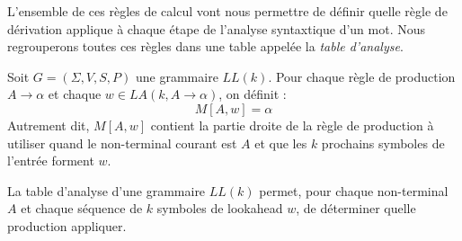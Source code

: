 L'ensemble de ces règles de calcul vont nous permettre de définir quelle règle de dérivation applique à chaque 
étape de l'analyse syntaxtique d'un mot. Nous regrouperons toutes ces règles dans une table appelée la 
\emph{table d'analyse}. 

\begin{definition}
     Soit $G = ( \Sigma, V, S, P)$ une grammaire $LL(k)$. Pour chaque règle de 
     production $A \longrightarrow \alpha$ et chaque $w \in LA(k, A \longrightarrow \alpha)$, on définit : 
        \[ M[A, w] = \alpha \] 
    Autrement dit, $ M[A,w]$ contient la partie droite de la règle de production à utiliser quand le non-terminal 
    courant est $A$ et que les $k$ prochains symboles de l'entrée forment $w$. 
\end{definition}

La table d’analyse d’une grammaire $LL(k)$ permet, pour chaque non-terminal $A$ et chaque séquence de 
$k$ symboles de lookahead $w$, de déterminer quelle production appliquer.

